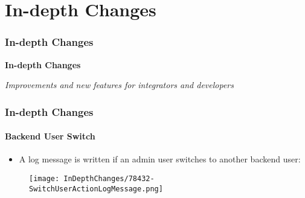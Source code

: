 %

\section{In-depth Changes}
\begin{frame}[fragile]
	\frametitle{In-depth Changes}

	\begin{center}\huge{\color{typo3darkgrey}\textbf{In-depth Changes}}\end{center}
	\begin{center}\large{\textit{Improvements and new features for integrators and developers}}\end{center}

\end{frame}


\begin{frame}[fragile]
	\frametitle{In-depth Changes}
	\framesubtitle{Backend User Switch}

	\begin{itemize}
		\item A log message is written if an admin user switches to another backend user:
	\end{itemize}

	\begin{figure}
		\texttt{[image: InDepthChanges/78432-SwitchUserActionLogMessage.png]}
	\end{figure}

\end{frame}


